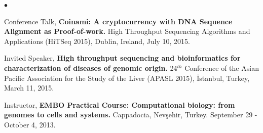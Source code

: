 \documentclass[margin,line]{res}
\newenvironment{list2}{
  \begin{list}{$\bullet$}{%
      \setlength{\itemsep}{0.1cm}
      \setlength{\parsep}{0in} \setlength{\parskip}{0in}
      \setlength{\topsep}{0in} \setlength{\partopsep}{0in} 
      \setlength{\leftmargin}{0.2in}}}{\end{list}}
\newcommand{\junk}[1]{}
\begin{document}
\begin{resume}
\begin{list2}
{\item
  Conference Talk, 
  {\bf Coinami: A cryptocurrency with DNA Sequence Alignment as Proof-of-work.}
  High Throughput Sequencing Algorithms and Applications (HiTSeq 2015), Dublin, Ireland, July 10, 2015.
}


\junk{
\item
  Invited Speaker, 
  {\bf Discovery of large genomic inversions using pooled clone sequencing.}
  İzmir Biomedicine and Genome Center, Dokuz Eylül University, İzmir, Turkey, April 20, 2015.
  
  }
\item
  Invited Speaker, 
  {\bf High throughput sequencing and bioinformatics for characterization of diseases of genomic origin.}
  24$^{th}$ Conference of the Asian Pacific Association for the Study of the Liver (APASL 2015), İstanbul, Turkey, March 11, 2015.
  
\junk{
\item
  Invited Speaker, 
  {\bf Genetik Hastalıkların Karakterizasyonunda Yüksek Ölçekli Dizileme ve Biyoenformatik.} {\it (in Turkish)},
  İzmir Biomedicine and Genome Center, Dokuz Eylül University, İzmir, Turkey, October 8, 2014

\item
  Invited Speaker, 
  {\bf Characterization of  genome structural variation and large inversions using NGS.}
  IU Bioinformatics Clinic, July 17, 2014. 

\item
  Conference Talk, 
  {\bf Characterization of large inversions using pooled clone sequencing.}
  European Molecular Biology Organization, Young Investigator Meeting, Heidelberg, Germany, May 14-16, 2014.


\item
  Invited Lecturer, 
  {\bf Characterization of mobile element insertions using NGS.}
  ALLBIO Course on Next Generation Sequencing (NGS) methods for identification of mutations and large structural variants,
  Lausanne, Switzerland, March 11-12, 2014.
\item
  Invited Speaker, 
  {\bf  Next-generation sequence characterization of complex genome structural variation.}
  İzmir Biomedicine and Genome Center, Dokuz Eylül University, İzmir, Turkey, October 8, 2014.
}
\clearpage
\item 
  Instructor,
  {\bf EMBO Practical Course: Computational biology: from genomes to cells and systems.}
  Cappadocia, Nevşehir, Turkey. September 29 - October 4, 2013.
 

\end{list2}
\end{resume}
\end{document}
